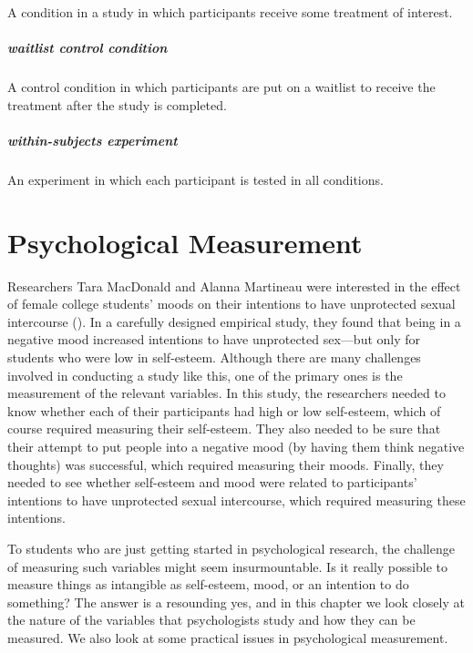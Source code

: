 \documentclass[
]{krantz}
\begin{document}
A condition in a study in which participants receive some treatment of interest.

\paragraph*{waitlist control condition}\label{waitlist-control-condition}

A control condition in which participants are put on a waitlist to receive the treatment after the study is completed.

\paragraph*{within-subjects experiment}\label{within-subjects-experiment}

An experiment in which each participant is tested in all conditions.

\chapter{Psychological Measurement}\label{psychological-measurement}

Researchers Tara MacDonald and Alanna Martineau were interested in the effect of female college students' moods on their intentions to have unprotected sexual intercourse (). In a carefully designed empirical study, they found that being in a negative mood increased intentions to have unprotected sex---but only for students who were low in self-esteem. Although there are many challenges involved in conducting a study like this, one of the primary ones is the measurement of the relevant variables. In this study, the researchers needed to know whether each of their participants had high or low self-esteem, which of course required measuring their self-esteem. They also needed to be sure that their attempt to put people into a negative mood (by having them think negative thoughts) was successful, which required measuring their moods. Finally, they needed to see whether self-esteem and mood were related to participants' intentions to have unprotected sexual intercourse, which required measuring these intentions.

To students who are just getting started in psychological research, the challenge of measuring such variables might seem insurmountable. Is it really possible to measure things as intangible as self-esteem, mood, or an intention to do something? The answer is a resounding yes, and in this chapter we look closely at the nature of the variables that psychologists study and how they can be measured. We also look at some practical issues in psychological measurement.
\end{document}
